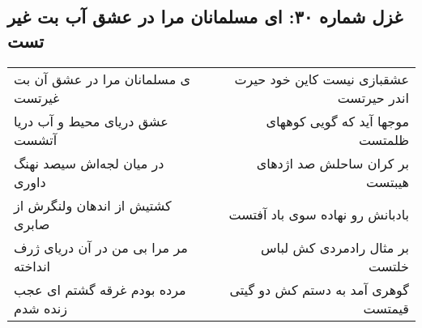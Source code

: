 \begin{center}
\section*{غزل شماره ۳۰: ای مسلمانان مرا در عشق آب بت غیر تست}
\label{sec:030}
\begin{longtable}{l p{0.5cm} r}
ی مسلمانان مرا در عشق آن بت غیرتست
&&
عشقبازی نیست کاین خود حیرت اندر حیرتست
\\
عشق دریای محیط و آب دریا آتشست
&&
موجها آید که گویی کوههای ظلمتست
\\
در میان لجه‌اش سیصد نهنگ داوری
&&
بر کران ساحلش صد اژدهای هیبتست
\\
کشتیش از اندهان ولنگرش از صابری
&&
بادبانش رو نهاده سوی باد آفتست
\\
مر مرا بی من در آن دریای ژرف انداخته
&&
بر مثال رادمردی کش لباس خلتست
\\
مرده بودم غرقه گشتم ای عجب زنده شدم
&&
گوهری آمد به دستم کش دو گیتی قیمتست
\\
\end{longtable}
\end{center}
